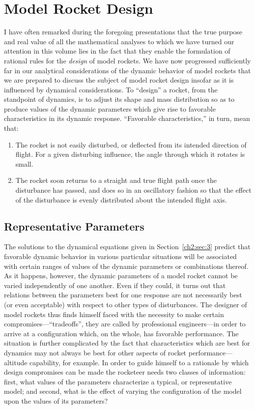 \section{Model Rocket Design}\label{ch2:sec:6}

I have often remarked during the foregoing presentations that the true
purpose and real value of all the mathematical analyses to which we have
turned our attention in this volume lies in the fact that they enable the
formulation of rational rules for the \emph{design} of model rockets. We have
now progressed sufficiently far in our analytical considerations of the
dynamic behavior of model rockets that we are prepared to discuss the subject
of model rocket design insofar as it is influenced by dynamical
considerations. To ``design'' a rocket, from the standpoint of dynamics, is to
adjust its shape and mass distribution so as to produce values of the dynamic
parameters which give rise to favorable characteristics in its dynamic
response. ``Favorable characteristics,'' in turn, mean that:
\begin{enumerate}[label=(\alph*)]
  \item The rocket is not easily disturbed, or deflected from its intended
  direction of flight. For a given disturbing influence, the angle through
  which it rotates is small.
  \item The rocket soon returns to a straight and true flight path once the
  disturbance has passed, and does so in an oscillatory fashion so that the
  effect of the disturbance is evenly distributed about the intended flight
  axis.
\end{enumerate}

\subsection{Representative Parameters}\label{ch2:sec:6.1}

The solutions to the dynamical equations given in Section~\ref{ch2:sec:3}
predict that favorable dynamic behavior in various particular situations will
be associated with certain ranges of values of the dynamic parameters or
combinations thereof. As it happens, however, the dynamic parameters of a
model rocket cannot be varied independently of one another. Even if they
could, it turns out that relations between the parameters best for one
response are not necessarily best (or even acceptable) with respect to other
types of disturbances. The designer of model rockets thus finds himself faced
with the necessity to make certain compromises---``tradeoffs'', they are
called by professional engineers---in order to arrive at a configuration
which, on the whole, has favorable performance. The situation is further
complicated by the fact that characteristics which are best for dynamics may
not always be best for other aspects of rocket performance---altitude
capability, for example. In order to guide himself to a rationale by which
design compromises can be made the rocketeer needs two classes of
information: first, what values of the parameters characterize a typical, or
representative model; and second, what is the effect of varying the
configuration of the model upon the values of its parameters?

